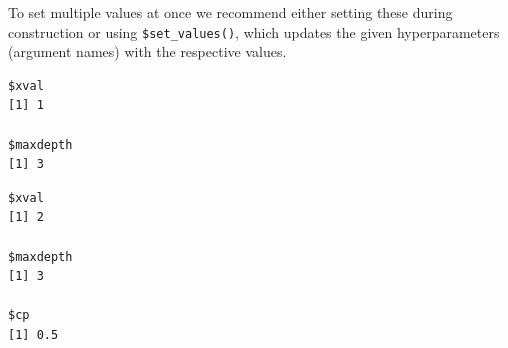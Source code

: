 To set multiple values at once we recommend either setting these during
construction or using
\texttt{\$set\_values()},
which updates the given hyperparameters (argument names) with the
respective values.

\begin{Shaded}
\begin{Highlighting}[]
\OtherTok{=} \NormalTok{(}\NormalTok{, } \NormalTok{, } \NormalTok{)}
\SpecialCharTok{$}\SpecialCharTok{$}
\end{Highlighting}
\end{Shaded}

\begin{verbatim}
$xval
[1] 1

$maxdepth
[1] 3
\end{verbatim}

\begin{Shaded}
\begin{Highlighting}[]
\SpecialCharTok{$}\SpecialCharTok{$}\NormalTok{(} \NormalTok{, } \NormalTok{)}
\SpecialCharTok{$}\SpecialCharTok{$}
\end{Highlighting}
\end{Shaded}

\begin{verbatim}
$xval
[1] 2

$maxdepth
[1] 3

$cp
[1] 0.5
\end{verbatim}

